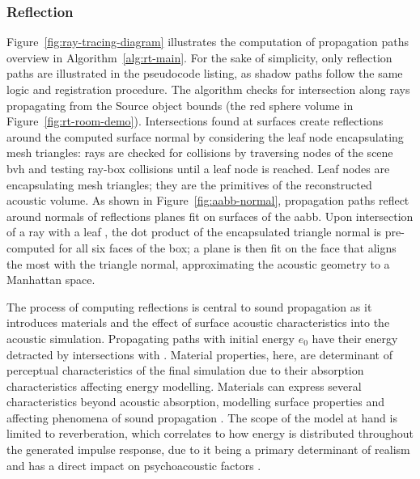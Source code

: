\subsubsection{Reflection}
Figure~\ref{fig:ray-tracing-diagram} illustrates the computation of propagation paths overview in Algorithm~\ref{alg:rt-main}. For the sake of simplicity, only reflection paths are illustrated in the pseudocode listing, as shadow paths follow the same logic and registration procedure. The algorithm checks for intersection along rays propagating from the Source object bounds (the red sphere volume in Figure~\ref{fig:rt-room-demo}). Intersections found at surfaces create reflections around the computed surface normal by considering the leaf node  encapsulating mesh triangles: rays are checked for collisions by traversing nodes of the scene \acrshort{bvh} and testing ray-box collisions until a leaf node is reached. Leaf nodes are  encapsulating mesh triangles; they are the primitives of the reconstructed acoustic volume. As shown in Figure~\ref{fig:aabb-normal}, propagation paths reflect around normals of reflections planes fit on surfaces of the \acrshort{aabb}. Upon intersection of a ray with a leaf , the dot product of the encapsulated triangle normal is pre-computed for all six faces of the box; a plane is then fit on the face that aligns the most with the triangle normal, approximating the acoustic geometry to a Manhattan space.\par
The process of computing reflections is central to sound propagation as it introduces materials and the effect of surface acoustic characteristics into the acoustic simulation. Propagating paths with initial energy $e_0$ have their energy detracted by intersections with . Material properties, here, are determinant of perceptual characteristics of the final simulation due to their absorption characteristics affecting energy modelling. Materials can express several characteristics beyond acoustic absorption, modelling surface properties and affecting phenomena of sound propagation \citep{kuttruff2016room}. The scope of the model at hand is limited to reverberation, which correlates to how energy is distributed throughout the generated impulse response, due to it being a primary determinant of realism and has a direct impact on psychoacoustic factors \citep{liu2022sound, rungta2016psychoacoustic}.\par

